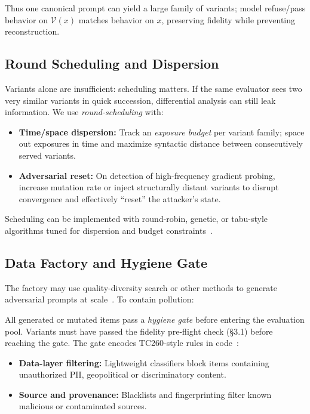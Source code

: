 \documentclass[letterpaper,twocolumn,10pt]{article}
\begin{document}
Thus one canonical prompt can yield a large family of variants; model refuse/pass behavior on $\mathcal{V}(x)$ matches behavior on $x$, preserving fidelity while preventing reconstruction.

\subsection{Round Scheduling and Dispersion}

Variants alone are insufficient: scheduling matters. If the same evaluator sees two very similar variants in quick succession, differential analysis can still leak information. We use \emph{round-scheduling} with:

\begin{itemize}
\item \textbf{Time/space dispersion:} Track an \emph{exposure budget} per variant family; space out exposures in time and maximize syntactic distance between consecutively served variants.
\item \textbf{Adversarial reset:} On detection of high-frequency gradient probing, increase mutation rate or inject structurally distant variants to disrupt convergence and effectively ``reset'' the attacker's state.
\end{itemize}

Scheduling can be implemented with round-robin, genetic, or tabu-style algorithms tuned for dispersion and budget constraints~\cite{round-robin-max-diff,genetic-round-robin}.

\subsection{Data Factory and Hygiene Gate}

The factory may use quality-diversity search or other methods to generate adversarial prompts at scale~\cite{quality-diversity}. To contain pollution:

All generated or mutated items pass a \emph{hygiene gate} before entering the evaluation pool. Variants must have passed the fidelity pre-flight check (\S3.1) before reaching the gate. The gate encodes TC260-style rules in code~\cite{tc260-governance}:

\begin{itemize}
\item \textbf{Data-layer filtering:} Lightweight classifiers block items containing unauthorized PII, geopolitical or discriminatory content.
\item \textbf{Source and provenance:} Blacklists and fingerprinting filter known malicious or contaminated sources.
\end{itemize}
\end{document}
